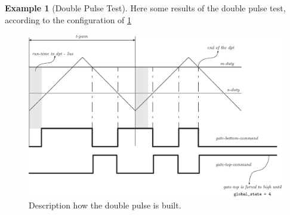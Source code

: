 \documentclass[11pt,a4paper,oneside]{book}
\numberwithin{equation}{section}
\theoremstyle{it}
\theoremstyle{definition}
\newtheorem{example}{Example}[section]
\begin{document}
\begin{example}[Double Pulse Test]
	Here some results of the double pulse test, according to the configuration of \ref{figure_1}
	\begin{figure}[H]
		\centering
		\includegraphics[width = 450pt, angle = 0, 
		keepaspectratio]{figures/double_pulse_test/dpt.eps}
		\captionsetup{width=0.5\textwidth, font=small}	
		\caption{Description how the double pulse is built.}
		\label{figure_1}
	\end{figure}
	

\end{example}
\end{document}
